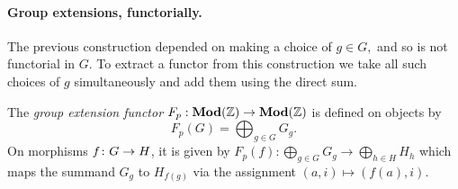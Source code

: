 \documentclass[runningheads]{llncs}
\begin{document}
 \paragraph*{Group extensions, functorially.}

The previous construction depended on making a choice of $g \in G,$ and so is not functorial in $G$. To extract a functor from this construction we take all such choices of $g$ simultaneously and add them using the direct sum.
\begin{definition}
\label{def:p-ification_functor}
The \emph{group extension functor} $F_p: \operatorname{\mathbf{Mod}}(\mathbb{Z}) \to \operatorname{\mathbf{Mod}}(\mathbb{Z})$ is defined on objects by
\begin{equation*}
    F_p(G) = \bigoplus_{g\in G} G_g.
\end{equation*}
On morphisms $f\colon G \to H$, it is given by $F_p(f): \bigoplus_{g\in G} G_g \to \bigoplus_{h\in H} H_h$ which maps the summand $G_g$ to $H_{f(g)}$ via the assignment $(a, i) \mapsto (f(a), i).$
\end{definition}
\end{document}

